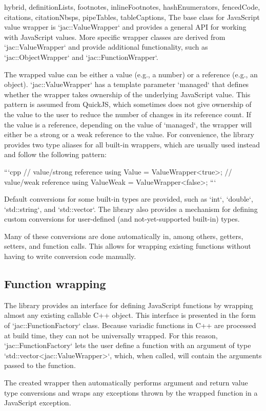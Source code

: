 \begin{markdown*}{%
  hybrid,
  definitionLists,
  footnotes,
  inlineFootnotes,
  hashEnumerators,
  fencedCode,
  citations,
  citationNbsps,
  pipeTables,
  tableCaptions,
}
The base class for JavaScript value wrapper is `jac::ValueWrapper` and provides a general API for working with JavaScript values. More specific wrapper classes are derived from `jac::ValueWrapper` and provide additional functionality, such as `jac::ObjectWrapper` and `jac::FunctionWrapper`.

The wrapped value can be either a value (e.g., a number) or a reference (e.g., an object).
`jac::ValueWrapper` has a template parameter `managed` that defines whether the wrapper takes ownership of the underlying JavaScript value. This pattern is assumed from QuickJS, which sometimes does not give ownership of the value to the user to reduce the number of changes in its reference count. If the value is a reference, depending on the value of `managed`, the wrapper will either be a strong or a weak reference to the value. For convenience, the library provides two type aliases for all built-in wrappers, which are usually used instead and follow the following pattern:

```cpp
// value/strong reference
using Value = ValueWrapper<true>;
// value/weak reference
using ValueWeak = ValueWrapper<false>;
```

Default conversions for some built-in types are provided, such as `int`, `double`, `std::string`, and `std::vector`. The library also provides a mechanism for defining custom conversions for user-defined (and not-yet-supported built-in) types.

Many of these conversions are done automatically in, among others, getters, setters, and function calls. This allows for wrapping existing functions without having to write conversion code manually.

\subsection{Function wrapping}

The library provides an interface for defining JavaScript functions by wrapping almost any existing callable C++ object. This interface is presented in the form of `jac::FunctionFactory` class. Because variadic functions in C++ are processed at build time, they can not be universally wrapped. For this reason, `jac::FunctionFactory` lets the user define a function with an argument of type `std::vector<jac::ValueWrapper>`, which, when called, will contain the arguments passed to the function.

The created wrapper then automatically performs argument and return value type conversions and wraps any exceptions thrown by the wrapped function in a JavaScript exception.


\end{markdown*}

